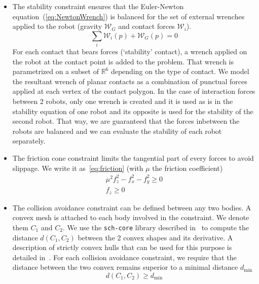 \begin{itemize}
\item The stability constraint ensures that the Euler-Newton equation~(\ref{eq:NewtonWrench}) is balanced for the set of external wrenches applied to the robot (gravity $\mathcal{W}_G$ and contact forces $\mathcal{W}_i$).
  \begin{equation}
    \sum_{i}{\mathcal{W}_i(p)} + {\mathcal{W}_G(p)} = 0
    \label{eq:NewtonWrench}
  \end{equation}
  For each contact that bears forces (`stability' contact), a wrench applied on the robot at the contact point is added to the problem.
  That wrench is parametrized on a subset of $\mathbb{R}^6$ depending on the type of contact.
  We model the resultant wrench of planar contacts as a combination of punctual forces applied at each vertex of the contact polygon.
  In the case of interaction forces between 2 robots, only one wrench is created and it is used as is in the stability equation of one robot and its opposite is used for the stability of the second robot.
  That way, we are guaranteed that the forces inbetween the robots are balanced and we can evaluate the stability of each robot separately.
\item The friction cone constraint limits the tangential part of every forces to avoid slippage.
  We write it as~\ref{eq:friction} (with $\mu$ the friction coefficient)
  \begin{equation}
    \begin{split}
      \mu^2f_z^2-f_x^2-f_y^2 \geq 0 \\
      f_z \geq 0
    \end{split}
    \label{eq:friction}
  \end{equation}
\item The collision avoidance constraint can be defined between any two bodies.
  A convex mesh is attached to each body involved in the constraint.
  We denote them $C_1$ and $C_2$.
  We use the {\tt sch-core} library described in~\cite{benallegue:icra:2009} to compute the distance $d(C_1,C_2)$ between the 2 convex shapes and its derivative.
  A description of strictly convex hulls that can be used for this purpose is detailed in~\cite{escande:itro:2014}.
  For each collision avoidance constraint, we require that the distance between the two convex remains superior to a minimal distance $d_{\min}$
  \begin{equation}
    d(C_1, C_2)\geq d_{\min}

\end{equation}
\end{itemize}
